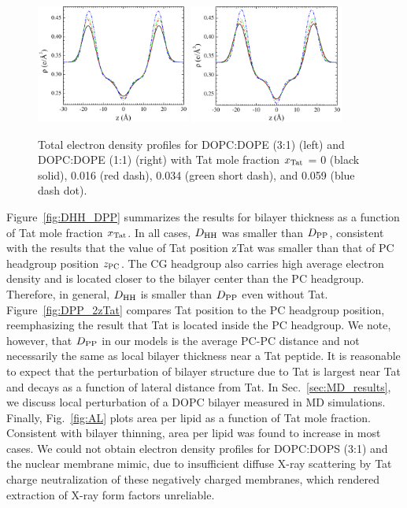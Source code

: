 \begin{figure}[htbp]
  \centering
  \includegraphics[width=0.45\textwidth]{figures/Tat/SDP_Results/EDP/DOPCDOPE3to1_Tat_total_EDP}
  \qquad
  \includegraphics[width=0.45\textwidth]{figures/Tat/SDP_Results/EDP/DOPCDOPE1to1_Tat_total_EDP}
  \caption[Total electron density profiles for DOPC:DOPE (3:1) (left) and 
  DOPC:DOPE (1:1) (right) with Tat mole fraction $\xTat$ = 0 (black solid),
  0.016 (red dash), 0.034 (green short dash), and 0.059 (blue dash dot)]
  {Total electron density profiles for DOPC:DOPE (3:1) (left) and 
  DOPC:DOPE (1:1) (right) with Tat mole fraction $\xTat$ = 0 (black solid),
  0.016 (red dash), 0.034 (green short dash), and 0.059 (blue dash dot).}
  \label{fig:DOPCDOPE_Tat_total_EDP}
\end{figure}

Figure~\ref{fig:DHH_DPP} summarizes the results for bilayer thickness as a function
of Tat mole fraction $\xTat$. In all cases, $D_\textrm{HH}$ was smaller than $D_\textrm{PP}$, consistent
with the results that the value of Tat position \gls{zTat} was smaller 
than that of PC headgroup position $z_\textrm{PC}$. The CG headgroup also carries 
high average electron density and is located closer to the bilayer center than
the PC headgroup. Therefore, in general, $D_\textrm{HH}$ is smaller than $D_\textrm{PP}$ even
without Tat. Figure~\ref{fig:DPP_2zTat} compares Tat position 
to the PC headgroup position, reemphasizing the result that Tat is located
inside the PC headgroup. We note, however, that $D_\textrm{PP}$ in our models is
the average PC-PC distance and not necessarily the same as local bilayer 
thickness near a Tat peptide. It is reasonable to expect that the perturbation
of bilayer structure due to Tat is largest near Tat and decays as a
function of lateral distance from Tat. In Sec.~\ref{sec:MD_results}, we 
discuss local perturbation of a DOPC bilayer measured in MD simulations.
Finally, Fig.~\ref{fig:AL} plots area per lipid as a function of Tat mole
fraction. Consistent with bilayer thinning, area per lipid was found to 
increase in most cases. 
We could not obtain electron density profiles for DOPC:DOPS (3:1) and the nuclear membrane 
mimic, due to insufficient diffuse X-ray scattering by Tat charge neutralization 
of these negatively charged membranes, which rendered extraction of 
X-ray form factors unreliable.

